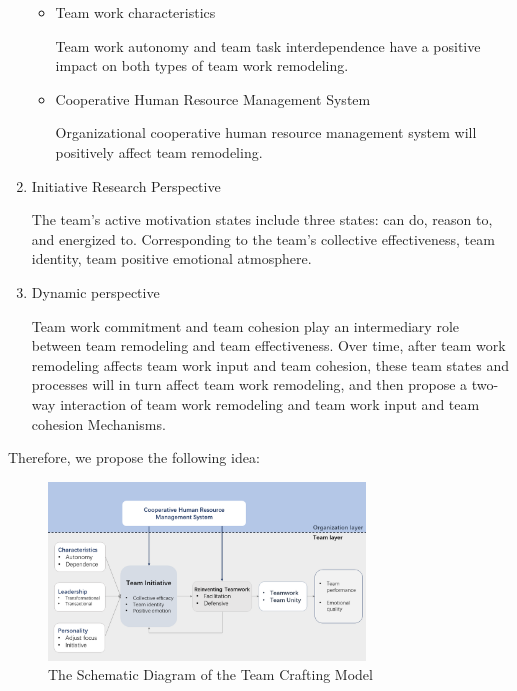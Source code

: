 \documentclass{mcmthesis}
\begin{document}
\begin{enumerate}
\begin{itemize}
		\item Team work characteristics
		
		\qquad Team work autonomy and team task interdependence have a positive impact on both types of team work remodeling.

		\item Cooperative Human Resource Management System
		
		\qquad Organizational cooperative human resource management system will positively affect team remodeling.
		\end{itemize}

		\item Initiative Research Perspective
		
		\qquad The team's active motivation states include three states: can do, reason to, and energized to.  Corresponding to the team's collective effectiveness, team identity, team positive emotional atmosphere.

		\item Dynamic perspective
		
		\qquad Team work commitment and team cohesion play an intermediary role between team remodeling and team effectiveness.  Over time, after team work remodeling affects team work input and team cohesion, these team states and processes will in turn affect team work remodeling, and then propose a two-way interaction of team work remodeling and team work input and team cohesion  Mechanisms.

	\end{enumerate}

	Therefore, we propose the following idea:
	\begin{figure}[h]
		\centering
		\includegraphics[width=0.75\textwidth]{figures/HR.png}
		\caption{The Schematic Diagram of the Team Crafting Model} 
		\label{fig:teammodel}
	\end{figure}
\end{document}

